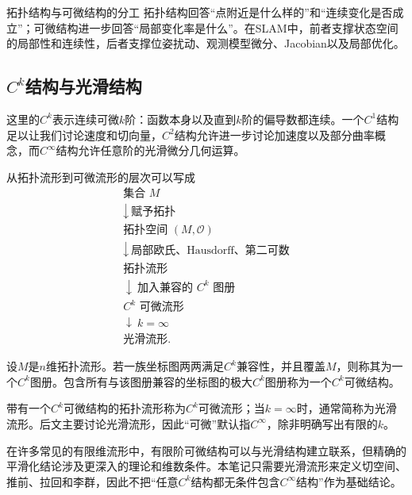 \begin{slamcase}{拓扑结构与可微结构的分工}
拓扑结构回答“点附近是什么样的”和“连续变化是否成立”；可微结构进一步回答“局部变化率是什么”。在SLAM中，前者支撑状态空间的局部性和连续性，后者支撑位姿扰动、观测模型微分、Jacobian以及局部优化。
\end{slamcase}

\subsection{$C^k$结构与光滑结构}

这里的$C^k$表示连续可微$k$阶：函数本身以及直到$k$阶的偏导数都连续。一个$C^1$结构足以让我们讨论速度和切向量，$C^2$结构允许进一步讨论加速度以及部分曲率概念，而$C^\infty$结构允许任意阶的光滑微分几何运算。

从拓扑流形到可微流形的层次可以写成
\[
\begin{array}{c}
\text{集合 }M\\[-2pt]
\downarrow\ \text{赋予拓扑}\\[-2pt]
\text{拓扑空间 }(M,\mathcal O)\\[-2pt]
\downarrow\ \text{局部欧氏、Hausdorff、第二可数}\\[-2pt]
\text{拓扑流形}\\[-2pt]
\downarrow\ \text{加入兼容的 }C^k\text{ 图册}\\[-2pt]
\text{$C^k$ 可微流形}\\[-2pt]
\downarrow\ k=\infty\\[-2pt]
\text{光滑流形}.
\end{array}
\]

\begin{definition}[可微结构]
设$M$是$n$维拓扑流形。若一族坐标图两两满足$C^k$兼容性，并且覆盖$M$，则称其为一个$C^k$图册。包含所有与该图册兼容的坐标图的极大$C^k$图册称为一个$C^k$可微结构。
\end{definition}

带有一个$C^k$可微结构的拓扑流形称为$C^k$可微流形；当$k=\infty$时，通常简称为光滑流形。后文主要讨论光滑流形，因此“可微”默认指$C^\infty$，除非明确写出有限的$k$。

\begin{remark}[关于有限阶可微结构]
在许多常见的有限维流形中，有限阶可微结构可以与光滑结构建立联系，但精确的平滑化结论涉及更深入的理论和维数条件。本笔记只需要光滑流形来定义切空间、推前、拉回和李群，因此不把“任意$C^k$结构都无条件包含$C^\infty$结构”作为基础结论。
\end{remark}


